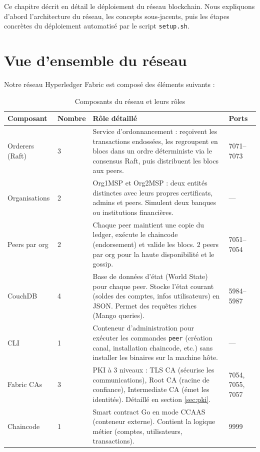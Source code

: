 \documentclass[12pt,a4paper,twoside]{report}
\begin{document}
Ce chapitre décrit en détail le déploiement du réseau blockchain. Nous expliquons d'abord l'architecture du réseau, les concepts sous-jacents, puis les étapes concrètes du déploiement automatisé par le script \texttt{setup.sh}.

\section{Vue d'ensemble du réseau}

Notre réseau Hyperledger Fabric est composé des éléments suivants :

\begin{table}[H]
\centering
\begin{tabularx}{\textwidth}{llXl}
\toprule
\textbf{Composant} & \textbf{Nombre} & \textbf{Rôle détaillé} & \textbf{Ports} \\
\midrule
Orderers (Raft) & 3 & Service d'ordonnancement : reçoivent les transactions endossées, les regroupent en blocs dans un ordre déterministe via le consensus Raft, puis distribuent les blocs aux peers. & 7071--7073 \\
Organisations & 2 & Org1MSP et Org2MSP : deux entités distinctes avec leurs propres certificats, admins et peers. Simulent deux banques ou institutions financières. & --- \\
Peers par org & 2 & Chaque peer maintient une copie du ledger, exécute le chaincode (endorsement) et valide les blocs. 2 peers par org pour la haute disponibilité et le gossip. & 7051--7054 \\
CouchDB & 4 & Base de données d'état (World State) pour chaque peer. Stocke l'état courant (soldes des comptes, infos utilisateurs) en JSON. Permet des requêtes riches (Mango queries). & 5984--5987 \\
CLI & 1 & Conteneur d'administration pour exécuter les commandes \texttt{peer} (création canal, installation chaincode, etc.) sans installer les binaires sur la machine hôte. & --- \\
Fabric CAs & 3 & PKI à 3 niveaux : TLS CA (sécurise les communications), Root CA (racine de confiance), Intermediate CA (émet les identités). Détaillé en section \ref{sec:pki}. & 7054, 7055, 7057 \\
Chaincode & 1 & Smart contract Go en mode CCAAS (conteneur externe). Contient la logique métier (comptes, utilisateurs, transactions). & 9999 \\
\bottomrule
\end{tabularx}
\caption{Composants du réseau et leurs rôles}
\end{table}
\end{document}
